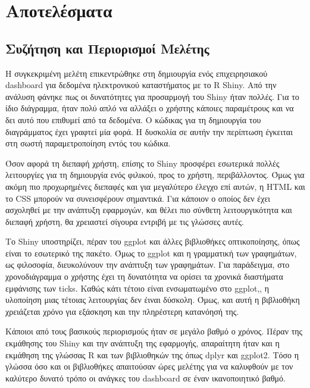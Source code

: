 \documentclass[greek, 12pt]{article}
\begin{document}
\newpage

\section{Αποτελέσματα}

\subsection{Συζήτηση και Περιορισμοί Μελέτης}

Η συγκεκριμένη μελέτη επικεντρώθηκε στη δημιουργία ενός επιχειρησιακού dashboard για δεδομένα ηλεκτρονικού καταστήματος με το R Shiny. Από την ανάλυση φάνηκε πως οι δυνατότητες για προσαρμογή του Shiny ήταν πολλές. Για το ίδιο διάγραμμα, ήταν πολύ απλό να αλλάξει ο χρήστης κάποιες παραμέτρους και να δει αυτό που επιθυμεί από τα δεδομένα. Ο κώδικας για τη δημιουργία του διαγράμματος έχει γραφτεί μία φορά. Η δυσκολία σε αυτήν την περίπτωση έγκειται στη σωστή παραμετροποίηση εντός του κώδικα.

Όσον αφορά τη διεπαφή χρήστη, επίσης το Shiny προσφέρει εσωτερικά πολλές λειτουργίες για τη δημιουργία ενός φιλικού, προς το χρήστη, περιβάλλοντος. Όμως για ακόμη πιο προχωρημένες διεπαφές και για μεγαλύτερο έλεγχο επί αυτών, η HTML και το CSS μπορούν να συνεισφέρουν σημαντικά. Για κάποιον ο οποίος δεν έχει ασχοληθεί με την ανάπτυξη εφαρμογών, και θέλει πιο σύνθετη λειτουργικότητα και διεπαφή χρήστη, θα χρειαστεί σίγουρα εντριβή με τις γλώσσες αυτές.

Το Shiny υποστηρίζει, πέραν του ggplot και άλλες βιβλιοθήκες οπτικοποίησης, όπως είναι το εσωτερικό της πακέτο. Όμως το ggplot και η γραμματική των γραφημάτων, ως φιλοσοφία, διευκολύνουν την ανάπτυξη των γραφημάτων. Για παράδειγμα, στο χρονοδιάγραμμα ο χρήστης έχει τη δυνατότητα να ορίσει τα χρονικά διαστήματα εμφάνισης των ticks. Καθώς κάτι τέτοιο είναι ενσωματωμένο στο ggplot,, η υλοποίηση μιας τέτοιας λειτουργίας δεν έιναι δύσκολη. Όμως, και αυτή η βιβλιοθήκη χρειάζεται χρόνο για εξάσκηση και την πληρέστερη κατανόησή της.

Κάποιοι από τους βασικούς περιορισμούς ήταν σε μεγάλο βαθμό ο χρόνος. Πέραν της εκμάθησης του Shiny και την ανάπτυξη της εφαρμογής, απαραίτητη ήταν και η εκμάθηση της γλώσσας R και των βιβλιοθηκών της όπως dplyr και ggplot2. Τόσο η γλώσσα όσο και οι βιβλιοθήκες απαιτούσαν ώρες μελέτης για να καλυφθούν με τον καλύτερο δυνατό τρόπο οι ανάγκες του dashboard σε έναν ικανοποιητικό βαθμό.
\end{document}
